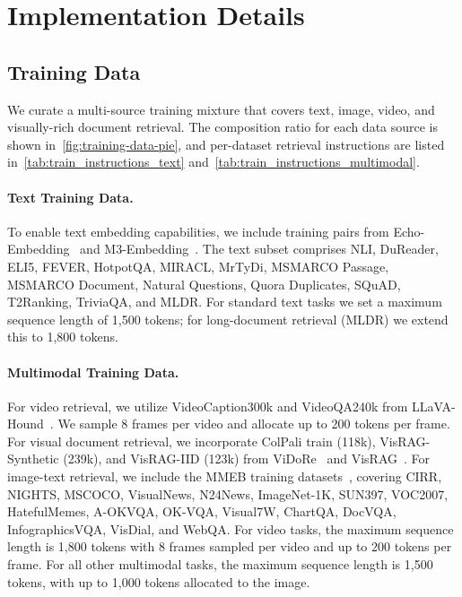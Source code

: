 \section{Implementation Details}\label{sec:appendix-implementation}

\subsection{Training Data} \label{sec:appendix-data}

We curate a multi-source training mixture that covers text, image, video, and visually-rich document retrieval.
The composition ratio for each data source is shown in~\autoref{fig:training-data-pie}, and per-dataset retrieval instructions are listed in~\autoref{tab:train_instructions_text} and~\autoref{tab:train_instructions_multimodal}.



\paragraph{Text Training Data.}
To enable text embedding capabilities, we include training pairs from Echo-Embedding~\citep{echoemb} and M3-Embedding~\citep{bgem3}.
The text subset comprises NLI, DuReader, ELI5, FEVER, HotpotQA, MIRACL, MrTyDi, MSMARCO Passage, MSMARCO Document, Natural Questions, Quora Duplicates, SQuAD, T2Ranking, TriviaQA, and MLDR.
For standard text tasks we set a maximum sequence length of 1{,}500 tokens; for long-document retrieval (MLDR) we extend this to 1{,}800 tokens.



\paragraph{Multimodal Training Data.}
For video retrieval, we utilize VideoCaption300k and VideoQA240k from LLaVA-Hound~\citep{llava-hound}.
We sample 8 frames per video and allocate up to 200 tokens per frame.
For visual document retrieval, we incorporate ColPali train (118k), VisRAG-Synthetic (239k), and VisRAG-IID (123k) from ViDoRe~\citep{vidore} and VisRAG~\citep{visrag}.
For image-text retrieval, we include the MMEB training datasets~\citep{vlm2vec}, covering CIRR, NIGHTS, MSCOCO, VisualNews, N24News, ImageNet-1K, SUN397, VOC2007, HatefulMemes, A-OKVQA, OK-VQA, Visual7W, ChartQA, DocVQA, InfographicsVQA, VisDial, and WebQA.
For video tasks, the maximum sequence length is 1{,}800 tokens with 8 frames sampled per video and up to 200 tokens per frame.
For all other multimodal tasks, the maximum sequence length is 1{,}500 tokens, with up to 1{,}000 tokens allocated to the image. 



